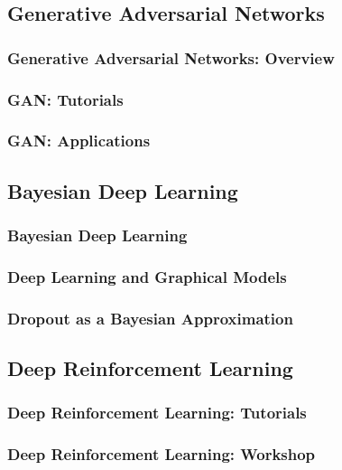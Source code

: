 \documentclass[11pt,
               hyperref={colorlinks,citecolor=pink,linkcolor=red,urlcolor=blue}
               ]{beamer}
\begin{document}
  \subsection{Generative Adversarial Networks}

  \begin{frame}
    \frametitle{Generative Adversarial Networks: Overview}

  \end{frame}

  \begin{frame}
    \frametitle{GAN: Tutorials}

  \end{frame}

  \begin{frame}
    \frametitle{GAN: Applications}

  \end{frame}

  \subsection{Bayesian Deep Learning}

  \begin{frame}
    \frametitle{Bayesian Deep Learning}

  \end{frame}

  \begin{frame}
    \frametitle{Deep Learning and Graphical Models}

  \end{frame}

  \begin{frame}
    \frametitle{Dropout as a Bayesian Approximation}

  \end{frame}

  \subsection{Deep Reinforcement Learning}

  \begin{frame}
    \frametitle{Deep Reinforcement Learning: Tutorials}

  \end{frame}

  \begin{frame}
    \frametitle{Deep Reinforcement Learning: Workshop}

  \end{frame}
\end{document}
